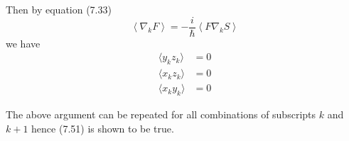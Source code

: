 \documentclass[12pt]{article}
\begin{document}
Then by equation (7.33)
\begin{equation*}
\left\langle\nabla_kF\right\rangle=-\frac{i}{\hbar}\left\langle F\nabla_kS\right\rangle
\tag{7.33}
\end{equation*}
we have
\begin{align*}
\langle y_kz_k\rangle&=0
\\
\langle x_kz_k\rangle&=0
\\
\langle x_ky_k\rangle&=0
\end{align*}

The above argument can be repeated for all combinations of subscripts $k$ and $k+1$
hence (7.51) is shown to be true.
\end{document}
